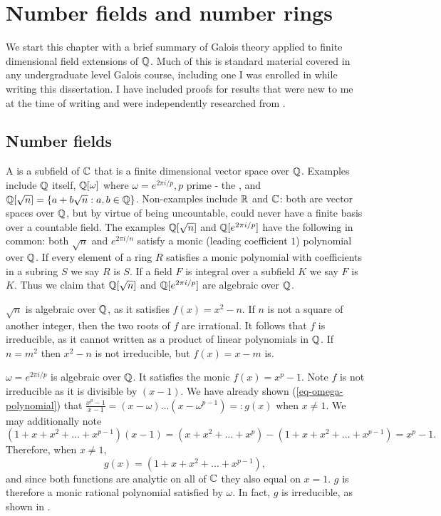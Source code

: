 \chapter{Number fields and number rings}\label{sec-number-fields}
We start this chapter with a brief summary of Galois theory applied to finite dimensional field extensions of $\mathbb{Q}$. Much of this is standard material covered in any undergraduate level Galois course, including one I was enrolled in while writing this dissertation. I have included proofs for results that were new to me at the time of writing and were independently researched from \cite{NumberFields}.
\section{Number fields}
A  is a subfield of $\mathbb{C}$ that is a finite dimensional vector space over $\mathbb{Q}$. Examples include $\mathbb{Q}$ itself, $\mathbb{Q}[\omega]$ where $\omega=e^{2\pi i/p},p$ prime - the , and $\mathbb{Q}[\sqrt{n}]=\{a+b\sqrt{n}:a,b\in \mathbb{Q}\}$. Non-examples include $\mathbb{R}$ and $\mathbb{C}$: both are vector spaces over $\mathbb{Q}$, but by virtue of being uncountable, could never have a finite basis over a countable field. The examples $\mathbb{Q}[\sqrt{n}]$ and $\mathbb{Q}[e^{2\pi i/p}]$ have the following in common: both $\sqrt{n}$ and $e^{2\pi i/n}$ satisfy a monic (leading coefficient $1$) polynomial over $\mathbb{Q}$. If every element of a ring $R$ satisfies a monic polynomial with coefficients in a subring $S$ we say $R$ is  $S$. If a field $F$ is integral over a subfield $K$ we say $F$ is  $K$. Thus we claim that $\mathbb{Q}[\sqrt{n}]$ and $\mathbb{Q}[e^{2\pi i/p}]$ are algebraic over $\mathbb{Q}$.

\begin{example}\label{ex-sqrt-n-algebraic}
$\sqrt{n}$ is algebraic over $\mathbb{Q}$, as it satisfies $f(x)=x^2-n$. If $n$ is not a square of another integer, then the two roots of $f$ are irrational. It follows that $f$ is irreducible, as it cannot written as a product of linear polynomials in $\mathbb{Q}$. If $n=m^2$ then $x^2-n$ is not irreducible, but $f(x)=x-m$ is.
\end{example}
\begin{example}\label{ex-omega-algebraic}
$\omega=e^{2\pi i/p}$ is algebraic over $\mathbb{Q}$. It satisfies the monic $f(x)=x^p-1$. Note $f$ is not irreducible as it is divisible by $(x-1)$. We have already shown (\cref{eq-omega-polynomial}) that $\frac{x^p-1}{x-1}=(x-\omega)\dots(x-\omega^{p-1})=:g(x)$ when $x\neq 1$.
We may additionally note
$$(1+x+x^2+\dots+x^{p-1})(x-1)=(x+x^2+\dots+x^p)-(1+x+x^2+\dots+x^{p-1})=x^p-1.$$
Therefore, 
when $x\neq 1$,
$$g(x)=(1+x+x^2+\dots+x^{p-1}),$$
and since both functions are analytic on all of $\mathbb{C}$ they also equal on $x=1$. $g$ is therefore a monic rational polynomial satisfied by $\omega$. In fact, $g$ is irreducible, as shown in \cite{Galois}.
\end{example}

